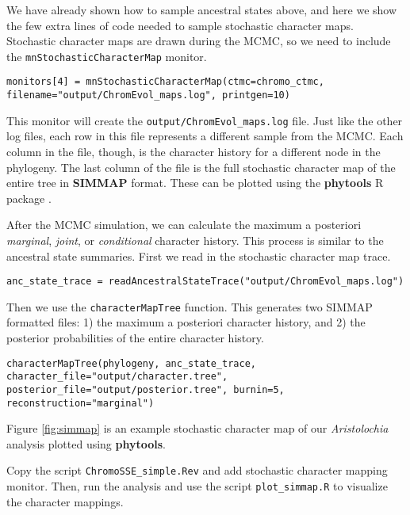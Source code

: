 We have already shown how to sample ancestral states above, and here we show
the few extra lines of \Rev code needed to sample stochastic character maps.
Stochastic character maps are drawn during the MCMC, so we need to include the
\texttt{mnStochasticCharacterMap} monitor.
{\tt \begin{snugshade*}
\begin{lstlisting}
monitors[4] = mnStochasticCharacterMap(ctmc=chromo_ctmc, filename="output/ChromEvol_maps.log", printgen=10)
\end{lstlisting}
\end{snugshade*}}
This monitor will create the \texttt{output/ChromEvol\_maps.log} file.
Just like the other log files, each row in this file represents a different sample from the MCMC.
Each column in the file, though, is the character history for a different node in the phylogeny.
The last column of the file is the full stochastic character map of the entire tree
in \textbf{SIMMAP} \citep{bollback2006simmap} format.
These can be plotted using the \textbf{phytools} R package \citep{revell2012phytools}.

After the MCMC simulation, we can calculate the maximum a posteriori \emph{marginal}, \emph{joint}, or \emph{conditional} character history. 
This process is similar to the ancestral state summaries.
First we read in the stochastic character map trace.
{\tt \begin{snugshade*}
\begin{lstlisting}
anc_state_trace = readAncestralStateTrace("output/ChromEvol_maps.log")
\end{lstlisting}
\end{snugshade*}}
Then we use the \texttt{characterMapTree} function. This generates two SIMMAP formatted files:
1) the maximum a posteriori character history, and 2) the posterior probabilities of the
entire character history.
{\tt \begin{snugshade*}
\begin{lstlisting}
characterMapTree(phylogeny, anc_state_trace, character_file="output/character.tree", posterior_file="output/posterior.tree", burnin=5, reconstruction="marginal")
\end{lstlisting}
\end{snugshade*}}
Figure \ref{fig:simmap} is an example stochastic character map of our \textit{Aristolochia} analysis plotted using \textbf{phytools}. 


\impmark Copy the script \texttt{ChromoSSE\_simple.Rev} and add stochastic character mapping monitor. Then, run the analysis and use the script \texttt{plot\_simmap.R} to visualize the character mappings. 

